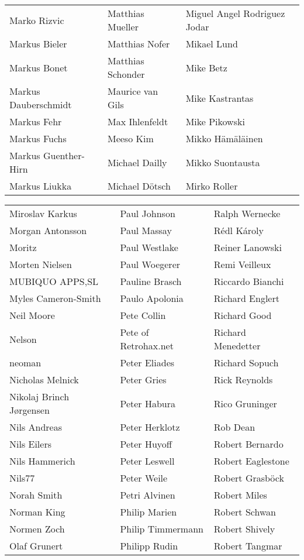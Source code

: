 \begin{tabular}{p{4.5cm}p{4.5cm}p{4.5cm}}
Marko Rizvic & Matthias Mueller & Miguel Angel Rodriguez Jodar \\
Markus Bieler & Matthias Nofer & Mikael Lund \\
Markus Bonet & Matthias Schonder & Mike Betz \\
Markus Dauberschmidt & Maurice van Gils & Mike Kastrantas \\
Markus Fehr & Max Ihlenfeldt & Mike Pikowski \\
Markus Fuchs & Meeso Kim & Mikko Hämäläinen \\
Markus Guenther-Hirn & Michael Dailly & Mikko Suontausta \\
Markus Liukka & Michael Dötsch & Mirko Roller \\
\end{tabular}
\newpage
\setlength{\tabcolsep}{1mm}
\begin{tabular}{p{4.5cm}p{4.5cm}p{4.5cm}}
Miroslav Karkus & Paul Johnson & Ralph Wernecke \\
Morgan Antonsson & Paul Massay & Rédl Károly \\
Moritz & Paul Westlake & Reiner Lanowski \\
Morten Nielsen & Paul Woegerer & Remi Veilleux \\
MUBIQUO APPS,SL & Pauline Brasch & Riccardo Bianchi \\
Myles Cameron-Smith & Paulo Apolonia & Richard Englert \\
Neil Moore & Pete Collin & Richard Good \\
Nelson & Pete of Retrohax.net & Richard Menedetter \\
neoman & Peter Eliades & Richard Sopuch \\
Nicholas Melnick & Peter Gries & Rick Reynolds \\
Nikolaj Brinch Jørgensen & Peter Habura & Rico Gruninger \\
Nils Andreas & Peter Herklotz & Rob Dean \\
Nils Eilers & Peter Huyoff & Robert Bernardo \\
Nils Hammerich & Peter Leswell & Robert Eaglestone \\
Nils77 & Peter Weile & Robert Grasböck \\
Norah Smith & Petri Alvinen & Robert Miles \\
Norman King & Philip Marien & Robert Schwan \\
Normen Zoch & Philip Timmermann & Robert Shively \\
Olaf Grunert & Philipp Rudin & Robert Tangmar \\

\end{tabular}
